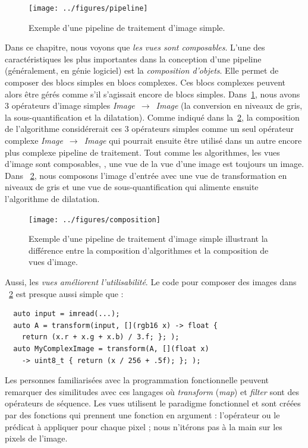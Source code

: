 \begin{figure}[htbp]
  \centering
  \texttt{[image: ../figures/pipeline]}
  \caption[]{Exemple d'une pipeline de traitement d'image simple.}
  \label{resume:fig:view.pipeline}
\end{figure}

Dans ce chapitre, nous voyons que \emph{les vues sont composables}. L'une des caractéristiques les plus importantes dans
la conception d'une pipeline (généralement, en génie logiciel) est la \emph{composition d'objets}. Elle permet de
composer des blocs simples en blocs complexes. Ces blocs complexes peuvent alors être gérés comme s'il s'agissait encore
de blocs simples. Dans~\cref{resume:fig:view.pipeline}, nous avons 3 opérateurs d'image simples
\emph{Image}~\(\rightarrow\)~\emph{Image} (la conversion en niveaux de gris, la sous-quantification et la dilatation).
Comme indiqué dans la~\cref{resume:fig:view.comp}, la composition de l'algorithme considérerait ces 3 opérateurs simples
comme un seul opérateur complexe \emph{Image}~\(\rightarrow\)~\emph{Image} qui pourrait ensuite être utilisé dans un
autre encore plus complexe pipeline de traitement. Tout comme les algorithmes, les vues d'image sont composables, \prex,
une vue de la vue d'une image est toujours un image. Dans ~\cref{resume:fig:view.comp}, nous composons l'image d'entrée
avec une vue de transformation en niveaux de gris et une vue de sous-quantification qui alimente ensuite l'algorithme de
dilatation.

\begin{figure}[htbp]
  \centering
  \texttt{[image: ../figures/composition]}
  \caption[]{Exemple d'une pipeline de traitement d'image simple illustrant la différence entre la composition
    d'algorithmes et la composition de vues d'image.}
  \label{resume:fig:view.comp}
\end{figure}

Aussi, les \emph{vues améliorent l'utilisabilité}. Le code pour composer des images dans ~\cref{resume:fig:view.comp}
est presque aussi simple que :

\begin{verbatim}
  auto input = imread(...);
  auto A = transform(input, [](rgb16 x) -> float {
    return (x.r + x.g + x.b) / 3.f; }; );
  auto MyComplexImage = transform(A, [](float x)
    -> uint8_t { return (x / 256 + .5f); }; );
\end{verbatim}

Les personnes familiarisées avec la programmation fonctionnelle peuvent remarquer des similitudes avec ces langages où
\emph{transform} (\emph{map}) et \emph{filter} sont des opérateurs de séquence. Les vues utilisent le paradigme
fonctionnel et sont créées par des fonctions qui prennent une fonction en argument : l'opérateur ou le prédicat à
appliquer pour chaque pixel ; nous n'itérons pas à la main sur les pixels de l'image.

